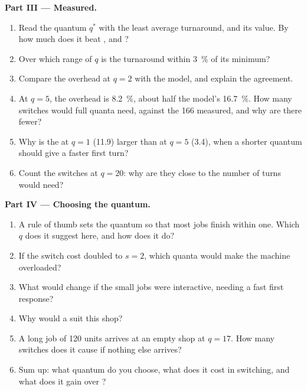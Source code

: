 \begin{problem}
\medskip\noindent\textbf{Part III --- Measured.}
\begin{enumerate}[resume]
\item Read the quantum $q^*$ with the least average turnaround, and its value. By how much does it beat , and ?
\item Over which range of $q$ is the turnaround within 3~\% of its minimum?
\item Compare the overhead at $q = 2$ with the model, and explain the agreement.
\item At $q = 5$, the overhead is 8.2~\%, about half the model's 16.7~\%. How many switches would full quanta need, against the 166 measured, and why are there fewer?
\item Why is the  at $q = 1$ (11.9) larger than at $q = 5$ (3.4), when a shorter quantum should give a faster first turn?
\item Count the switches at $q = 20$: why are they close to the number of turns  would need?
\end{enumerate}

\medskip\noindent\textbf{Part IV --- Choosing the quantum.}
\begin{enumerate}[resume]
\item A rule of thumb sets the quantum so that most jobs finish within one. Which $q$ does it suggest here, and how does it do?
\item If the switch cost doubled to $s = 2$, which quanta would make the machine overloaded?
\item What would change if the small jobs were interactive, needing a fast first response?
\item Why would a  suit this shop?
\item A long job of 120 units arrives at an empty shop at $q = 17$. How many switches does it cause if nothing else arrives?
\item Sum up: what quantum do you choose, what does it cost in switching, and what does it gain over ?
\end{enumerate}
\end{problem}
